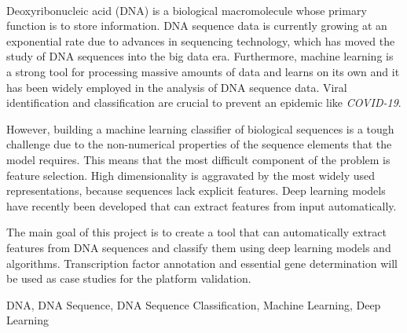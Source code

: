 {\large \textbf{\thetitle}}\\[1ex]
\noindent Deoxyribonucleic acid (DNA) is a biological macromolecule whose primary function is to store information. DNA sequence data is currently growing at an exponential rate due to advances in sequencing technology, which has moved the study of DNA sequences into the big data era. Furthermore, machine learning is a strong tool for processing massive amounts of data and learns on its own and it has been widely employed in the analysis of DNA sequence data. Viral identification and classification are crucial to prevent an epidemic like \emph{COVID-19}.

However, building a machine learning classifier of biological sequences is a tough challenge due to the non-numerical properties of the sequence elements that the model requires. This means that the most difficult component of the problem is feature selection. High dimensionality is aggravated by the most widely used representations, because sequences lack explicit features. Deep learning models have recently been developed that can extract features from input automatically.

The main goal of this project is to create a tool that can automatically extract features from DNA sequences and classify them using deep learning models and algorithms. Transcription factor annotation and essential gene determination will be used as case studies for the platform validation.

\begin{keywords}
DNA, DNA Sequence, DNA Sequence Classification, Machine Learning, Deep Learning
\end{keywords} 
